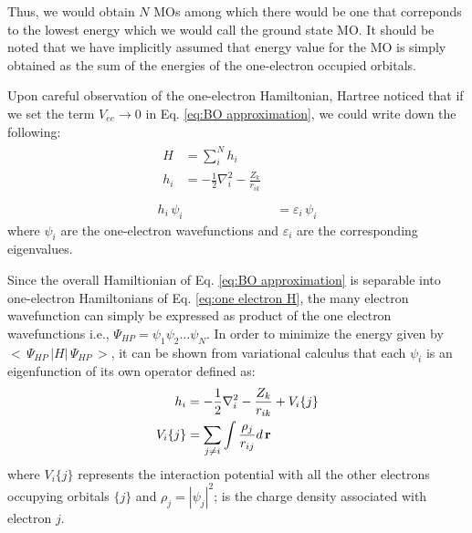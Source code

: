             Thus, we would obtain $N$ MOs among which there would be one that correponds to the lowest energy which we would call the ground state MO. It should be noted that we have implicitly assumed that energy value for the MO is simply obtained as the sum of the energies of the one-electron occupied orbitals.

            Upon careful observation of the one-electron Hamiltonian, Hartree noticed that if we set the term $V_{ee} \to 0$ in Eq. \eqref{eq:BO approximation}, we could write down the following:
            \begin{subequations}
                \begin{align}
                    \begin{split}
                        H &= \displaystyle\sum_i^N h_i\\
                        h_i &= -\frac{1}{2} \nabla^2_i - \frac{Z_k}{r_{ik}} \label{eq:one electron H}\\
                    \end{split}\\
                    h_i\,\psi_i\, &= \varepsilon_i \, \psi_i \label{eq:one electron SE}
                \end{align}
            \end{subequations}
            where $\psi_i$ are the one-electron wavefunctions and $\varepsilon_i$ are the corresponding eigenvalues.

            Since the overall Hamiltionian of Eq. \eqref{eq:BO approximation} is separable into one-electron Hamiltonians of Eq. \eqref{eq:one electron H}, the many electron wavefunction can simply be expressed as product of the one electron wavefunctions i.e., $\Psi_{HP} = \psi_1 \psi_2 \ldots \psi_N$. In order to minimize the energy given by $<\,\Psi_{HP}\, | H |\,\Psi_{HP}\,>$, it can be shown from variational calculus that each $\psi_i$ is an eigenfunction of its own operator defined as:
            \begin{equation}\label{eq:correct Hamiltonian}
                \begin{aligned}
                    h_i &= -\frac{1}{2} \nabla^2_i - \frac{Z_k}{r_{ik}} + V_i \{j\}\\
                    V_i \{j\} &= \displaystyle\sum_{j \ne i} \int \frac{\rho_j}{r_{ij}} d\,{\mathbf {r}}
                \end{aligned}
            \end{equation}
            where $V_i \{j\}$ represents the interaction potential with all the other electrons occupying orbitals $\{j\}$ and $\rho_j = |\psi_j|^2$; is the charge density associated with electron $j$.

